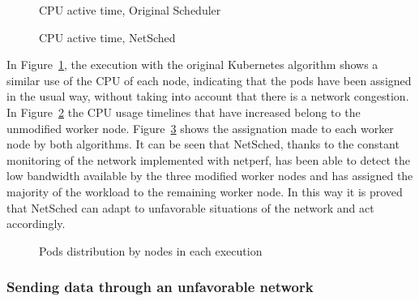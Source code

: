 \documentclass[conference]{IEEEtran}
\begin{document}
\begin{figure}[t]
\begin{center}
\strut{}
\caption{CPU active time, Original Scheduler}\label{fig:cputimeori}
\end{center}
\end{figure}

\begin{figure}[h]
\begin{center}
\strut{}
\caption{CPU active time, NetSched}\label{fig:cputimenetsched}
\end{center}
\end{figure}

In Figure~\ref{fig:cputimeori},  the execution with the original Kubernetes algorithm shows a similar use of the CPU of each node, indicating that the pods have been assigned in the usual way, without taking into account that there is a network congestion. In Figure~\ref{fig:cputimenetsched} the CPU usage timelines that have increased belong to the unmodified worker node. Figure~\ref{fig:podsnodes} shows the assignation made to each worker node by both algorithms. 
It can be seen that NetSched, thanks to the constant monitoring of the network implemented with netperf, has 
been able to detect the low bandwidth available by the three modified worker nodes and has assigned the majority of the workload to the remaining worker node. In this way it is proved that NetSched can adapt to unfavorable situations of the network and act accordingly.


\begin{figure}[h]
\begin{center}
\strut{}
\caption{Pods distribution by nodes in each execution}\label{fig:podsnodes}
\end{center}
\end{figure}

\subsubsection{Sending data through an unfavorable network}\label{sec:unfavnet}
\end{document}
